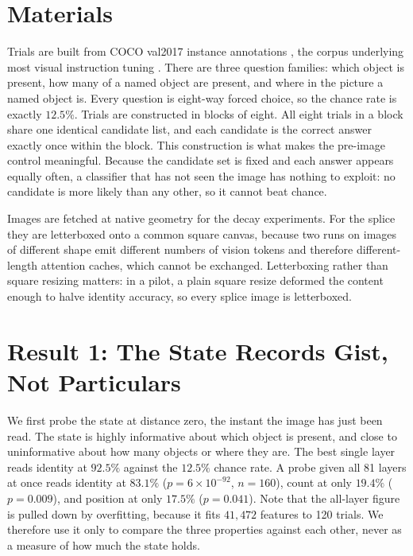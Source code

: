 \documentclass{article}
\begin{document}
\section{Materials}

Trials are built from COCO val2017 instance annotations \cite{lin2014coco},
the corpus underlying most visual instruction tuning \cite{liu2023llava}.
There are three question families: which object is present, how many of a
named object are present, and where in the picture a named object is. Every
question is eight-way forced choice, so the chance rate is exactly $12.5\%$.
Trials are constructed in blocks of eight. All eight trials in a block share
one identical candidate list, and each candidate is the correct answer exactly
once within the block. This construction is what makes the pre-image control
meaningful. Because the candidate set is fixed and each answer appears
equally often, a classifier that has not seen the image has nothing to
exploit: no candidate is more likely than any other, so it cannot beat
chance.

Images are fetched at native geometry for the decay experiments. For the splice
they are letterboxed onto a common square canvas, because two runs on images of
different shape emit different numbers of vision tokens and therefore
different-length attention caches, which cannot be exchanged. Letterboxing
rather than square resizing matters: in a pilot, a plain square resize deformed
the content enough to halve identity accuracy, so every splice image is
letterboxed.

\section{Result 1: The State Records Gist, Not Particulars}

We first probe the state at distance zero, the instant the image has just
been read. The state is highly informative about which object is present, and
close to uninformative about how many objects or where they are. The best
single layer reads identity at $92.5\%$ against the $12.5\%$ chance rate. A
probe given all 81 layers at once reads identity at $83.1\%$
($p = 6 \times 10^{-92}$, $n = 160$), count at only $19.4\%$ ($p = 0.009$),
and position at only $17.5\%$ ($p = 0.041$). Note that the all-layer figure is
pulled down by overfitting, because it fits $41{,}472$ features to 120 trials.
We therefore use it only to compare the three properties against each other,
never as a measure of how much the state holds.
\end{document}
